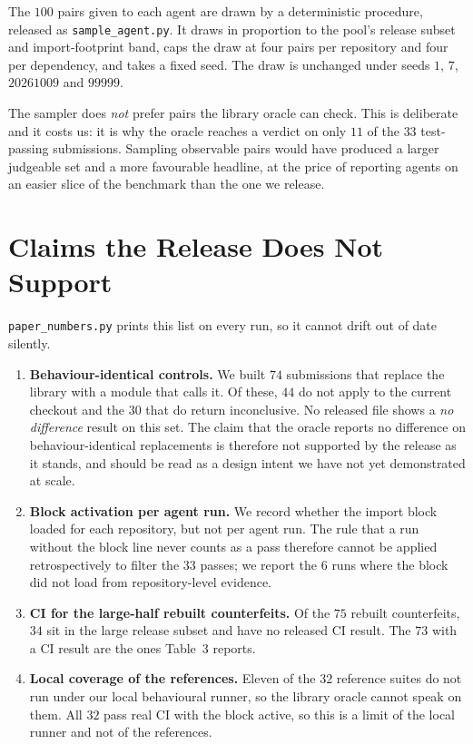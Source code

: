 The $100$ pairs given to each agent are drawn by a deterministic
procedure, released as \texttt{sample\_agent.py}. It draws in proportion
to the pool's release subset and import-footprint band, caps the draw at
four pairs per repository and four per dependency, and takes a fixed
seed. The draw is unchanged under seeds $1$, $7$, $20261009$ and
$99999$.

The sampler does \emph{not} prefer pairs the library oracle can check.
This is deliberate and it costs us: it is why the oracle reaches a
verdict on only $11$ of the $33$ test-passing submissions. Sampling
observable pairs would have produced a larger judgeable set and a more
favourable headline, at the price of reporting agents on an easier slice
of the benchmark than the one we release.

\section{Claims the Release Does Not Support}
\label{app:cannot-support}

\texttt{paper\_numbers.py} prints this list on every run, so it cannot
drift out of date silently.

\begin{enumerate}\itemsep2pt
\item \textbf{Behaviour-identical controls.} We built $74$ submissions
that replace the library with a module that calls it. Of these, $44$ do
not apply to the current checkout and the $30$ that do return
inconclusive. No released file shows a \emph{no difference} result on
this set. The claim that the oracle reports no difference on
behaviour-identical replacements is therefore not supported by the
release as it stands, and should be read as a design intent we have not
yet demonstrated at scale.

\item \textbf{Block activation per agent run.} We record whether the
import block loaded for each repository, but not per agent run. The rule
that a run without the block line never counts as a pass therefore
cannot be applied retrospectively to filter the $33$ passes; we report
the $6$ runs where the block did not load from repository-level
evidence.

\item \textbf{CI for the large-half rebuilt counterfeits.} Of the $75$
rebuilt counterfeits, $34$ sit in the large release subset and have no
released CI result. The $73$ with a CI result are the ones Table~3
reports.

\item \textbf{Local coverage of the references.} Eleven of the $32$
reference suites do not run under our local behavioural runner, so the
library oracle cannot speak on them. All $32$ pass real CI with the
block active, so this is a limit of the local runner and not of the
references.
\end{enumerate}


